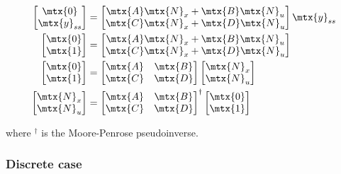 \begin{align*}
  \begin{bmatrix}
    \mtx{0} \\
    \mtx{y}_{ss}
  \end{bmatrix} &=
  \begin{bmatrix}
    \mtx{A}\mtx{N}_x + \mtx{B}\mtx{N}_u \\
    \mtx{C}\mtx{N}_x + \mtx{D}\mtx{N}_u
  \end{bmatrix}
  \mtx{y}_{ss} \\
  \begin{bmatrix}
    \mtx{0} \\
    \mtx{1}
  \end{bmatrix} &=
  \begin{bmatrix}
    \mtx{A}\mtx{N}_x + \mtx{B}\mtx{N}_u \\
    \mtx{C}\mtx{N}_x + \mtx{D}\mtx{N}_u
  \end{bmatrix} \\
  \begin{bmatrix}
    \mtx{0} \\
    \mtx{1}
  \end{bmatrix} &=
  \begin{bmatrix}
    \mtx{A} & \mtx{B} \\
    \mtx{C} & \mtx{D}
  \end{bmatrix}
  \begin{bmatrix}
    \mtx{N}_x \\
    \mtx{N}_u
  \end{bmatrix} \\
  \begin{bmatrix}
    \mtx{N}_x \\
    \mtx{N}_u
  \end{bmatrix} &=
  \begin{bmatrix}
    \mtx{A} & \mtx{B} \\
    \mtx{C} & \mtx{D}
  \end{bmatrix}^{\dagger}
  \begin{bmatrix}
    \mtx{0} \\
    \mtx{1}
  \end{bmatrix}
\end{align*}

where $^\dagger$ is the Moore-Penrose pseudoinverse.

\subsubsection{Discrete case}

